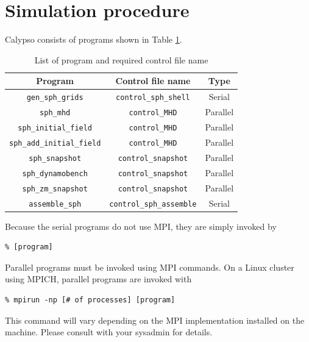 \section{Simulation procedure}
Calypso consists of programs shown in Table \ref{table:controls}.
%
\begin{table}[htdp]
\caption{List of program and required control file name}
\begin{center}
\begin{tabular}{|c|c|c|}
\hline
Program & Control file name & Type \\ \hline
\verb|gen_sph_grids|         & \verb|control_sph_shell| &  Serial    \\
\verb|sph_mhd|               & \verb|control_MHD| &        Parallel  \\
\verb|sph_initial_field|     & \verb|control_MHD| &        Parallel  \\
\verb|sph_add_initial_field| & \verb|control_MHD| &        Parallel  \\
\verb|sph_snapshot|          & \verb|control_snapshot| &   Parallel  \\
\verb|sph_dynamobench|       & \verb|control_snapshot| &   Parallel  \\
\verb|sph_zm_snapshot|       & \verb|control_snapshot| &   Parallel  \\
\verb|assemble_sph|          & \verb|control_sph_assemble| & Serial  \\ \hline
\end{tabular}
\end{center}
\label{table:controls}
\end{table}
%
Because the serial programs do not use MPI, they are simply invoked by
%
\begin{verbatim}
% [program]
\end{verbatim}
%
Parallel programs must be invoked using MPI commands. On a Linux cluster using MPICH, parallel programs are invoked with 
%
\begin{verbatim}
% mpirun -np [# of processes] [program]
\end{verbatim}
%

This command will vary depending on the MPI implementation installed on the machine.  Please consult with your sysadmin for details.


